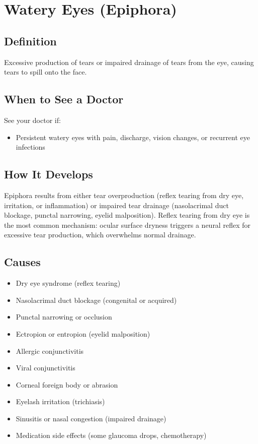 \chapter{Watery Eyes (Epiphora)}

\section*{Definition}
Excessive production of tears or impaired drainage of tears from the eye, causing tears to spill onto the face.

\section*{When to See a Doctor}
See your doctor if:
\begin{itemize}
  \item Persistent watery eyes with pain, discharge, vision changes, or recurrent eye infections
\end{itemize}

\section*{How It Develops}
Epiphora results from either tear overproduction (reflex tearing from dry eye, irritation, or inflammation) or impaired tear drainage (nasolacrimal duct blockage, punctal narrowing, eyelid malposition). Reflex tearing from dry eye is the most common mechanism: ocular surface dryness triggers a neural reflex for excessive tear production, which overwhelms normal drainage.

\section*{Causes}
\begin{itemize}
  \item Dry eye syndrome (reflex tearing)
  \item Nasolacrimal duct blockage (congenital or acquired)
  \item Punctal narrowing or occlusion
  \item Ectropion or entropion (eyelid malposition)
  \item Allergic conjunctivitis
  \item Viral conjunctivitis
  \item Corneal foreign body or abrasion
  \item Eyelash irritation (trichiasis)
  \item Sinusitis or nasal congestion (impaired drainage)
  \item Medication side effects (some glaucoma drops, chemotherapy)
\end{itemize}


